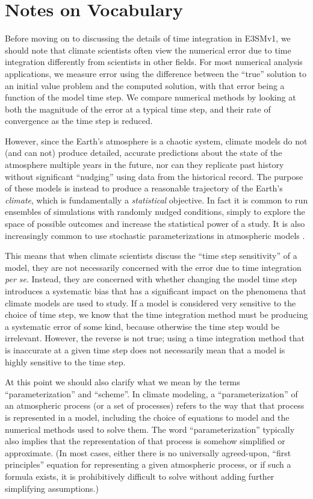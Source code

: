 \documentclass [11pt, proquest] {uwthesis}[2020/02/24]
\begin{document}
\section{Notes on Vocabulary} \label{sec:vocab}

Before moving on to discussing the details of time integration in E3SMv1, we should note that climate scientists often view the numerical error due to time integration differently from scientists in other fields. For most numerical analysis applications, we measure error using the difference between the ``true'' solution to an initial value problem and the computed solution, with that error being a function of the model time step. We compare numerical methods by looking at both the magnitude of the error at a typical time step, and their rate of convergence as the time step is reduced.

However, since the Earth's atmosphere is a chaotic system, climate models do not (and can not) produce detailed, accurate predictions about the state of the atmosphere multiple years in the future, nor can they replicate past history without significant ``nudging'' using data from the historical record. The purpose of these models is instead to produce a reasonable trajectory of the Earth's \emph{climate}, which is fundamentally a \emph{statistical} objective. In fact it is common to run ensembles of simulations with randomly nudged conditions, simply to explore the space of possible outcomes and increase the statistical power of a study. It is also increasingly common to use stochastic parameterizations in atmospheric models \parencite{Berner2017,Leutbecher2017,Stinis2020}.

This means that when climate scientists discuss the ``time step sensitivity'' of a model, they are not necessarily concerned with the error due to time integration \emph{per se}. Instead, they are concerned with whether changing the model time step introduces a systematic bias that has a significant impact on the phenomena that climate models are used to study. If a model is considered very sensitive to the choice of time step, we know that the time integration method must be producing a systematic error of some kind, because otherwise the time step would be irrelevant. However, the reverse is not true; using a time integration method that is inaccurate at a given time step does not necessarily mean that a model is highly sensitive to the time step.

At this point we should also clarify what we mean by the terms ``parameterization'' and ``scheme''. In climate modeling, a ``parameterization'' of an atmospheric process (or a set of processes) refers to the way that that process is represented in a model, including the choice of equations to model and the numerical methods used to solve them. The word ``parameterization'' typically also implies that the representation of that process is somehow simplified or approximate. (In most cases, either there is no universally agreed-upon, ``first principles'' equation for representing a given atmospheric process, or if such a formula exists, it is prohibitively difficult to solve without adding further simplifying assumptions.)
\end{document}
